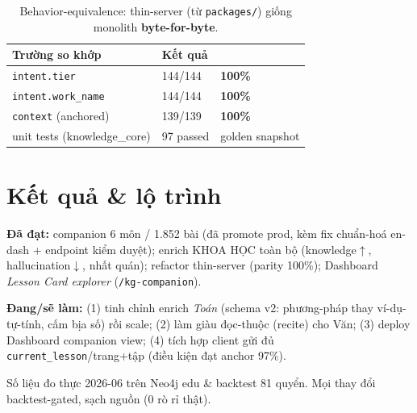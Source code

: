 \documentclass[11pt,a4paper]{article}
\newcommand{\metric}[1]{{\sffamily\bfseries\color{cprim}#1}}
\begin{document}
\begin{table}[h]\centering\small\sffamily
\begin{tabular}{lll}
\toprule
\textbf{Trường so khớp} & \textbf{Kết quả} & \\
\midrule
\texttt{intent.tier} & 144/144 & \metric{100\%}\\
\texttt{intent.work\_name} & 144/144 & \metric{100\%}\\
\texttt{context} (anchored) & 139/139 & \metric{100\%}\\
unit tests (knowledge\_core) & 97 passed & golden snapshot \\
\bottomrule
\end{tabular}
\caption{Behavior-equivalence: thin-server (từ \texttt{packages/}) giống monolith \textbf{byte-for-byte}.}
\end{table}

\section{Kết quả \& lộ trình}
\textbf{Đã đạt:} companion 6 môn / 1.852 bài (đã promote prod, kèm fix chuẩn-hoá en-dash + endpoint
kiểm duyệt); enrich KHOA HỌC toàn bộ (knowledge$\uparrow$, hallucination$\downarrow$, nhất quán);
refactor thin-server (parity 100\%); Dashboard \emph{Lesson Card explorer} (\texttt{/kg-companion}).

\textbf{Đang/sẽ làm:} (1) tinh chỉnh enrich \emph{Toán} (schema v2: phương-pháp thay ví-dụ-tự-tính,
cấm bịa số) rồi scale; (2) làm giàu đọc-thuộc (recite) cho Văn; (3) deploy Dashboard companion view;
(4) tích hợp client gửi đủ \texttt{current\_lesson}/trang+tập (điều kiện đạt anchor 97\%).

\vspace{0.6cm}
\begin{center}\small\color{cgray}\sffamily
Số liệu đo thực 2026-06 trên Neo4j edu \& backtest 81 quyển. Mọi thay đổi backtest-gated, sạch nguồn (0 rò rỉ thật).
\end{center}
\end{document}
